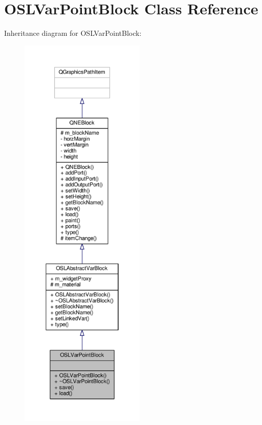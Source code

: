 \hypertarget{class_o_s_l_var_point_block}{\section{O\-S\-L\-Var\-Point\-Block Class Reference}
\label{class_o_s_l_var_point_block}
}


Inheritance diagram for O\-S\-L\-Var\-Point\-Block\-:
\nopagebreak
\begin{figure}[H]
\begin{center}
\leavevmode
\includegraphics[height=550pt]{class_o_s_l_var_point_block__inherit__graph}
\end{center}
\end{figure}


